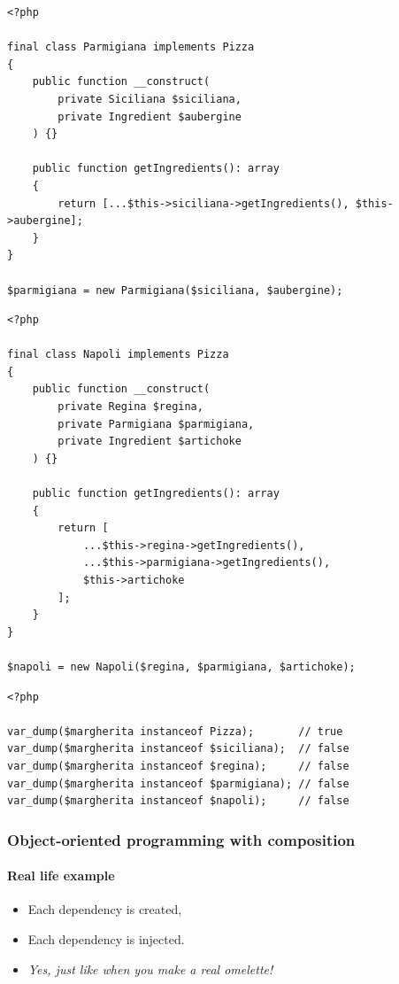 \begin{frame}[fragile,c]
    \begin{lstlisting}
<?php

final class Parmigiana implements Pizza
{
    public function __construct(
        private Siciliana $siciliana,
        private Ingredient $aubergine
    ) {}

    public function getIngredients(): array
    {
        return [...$this->siciliana->getIngredients(), $this->aubergine];
    }
}

$parmigiana = new Parmigiana($siciliana, $aubergine);
    \end{lstlisting}
\end{frame}

\begin{frame}[fragile,c]
    \begin{lstlisting}
<?php

final class Napoli implements Pizza
{
    public function __construct(
        private Regina $regina,
        private Parmigiana $parmigiana,
        private Ingredient $artichoke
    ) {}

    public function getIngredients(): array
    {
        return [
            ...$this->regina->getIngredients(),
            ...$this->parmigiana->getIngredients(),
            $this->artichoke
        ];
    }
}

$napoli = new Napoli($regina, $parmigiana, $artichoke);
    \end{lstlisting}
\end{frame}

\begin{frame}[fragile,c]
    \begin{lstlisting}
<?php

var_dump($margherita instanceof Pizza);       // true
var_dump($margherita instanceof $siciliana);  // false
var_dump($margherita instanceof $regina);     // false
var_dump($margherita instanceof $parmigiana); // false
var_dump($margherita instanceof $napoli);     // false
    \end{lstlisting}
\end{frame}

\begin{frame}
    \frametitle{Object-oriented programming with composition}
    \framesubtitle{Real life example}

    \begin{itemize}[<+->]
        \item Each dependency is created,
        \item Each dependency is injected.
        \item \textit{Yes, just like when you make a real omelette!}
    \end{itemize}
\end{frame}

